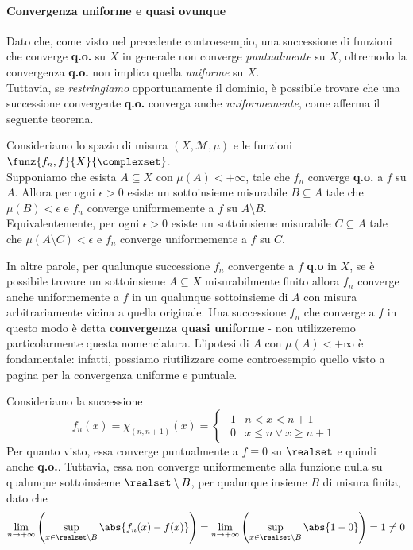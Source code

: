 \paragraph{Convergenza uniforme e quasi ovunque}
Dato che, come visto nel precedente controesempio, una successione di funzioni che converge \textbf{q.o.} su $X$ in generale non converge \textit{puntualmente} su $X$, oltremodo la convergenza \textbf{q.o.} non implica quella \textit{uniforme} su $X$.\\
Tuttavia, se \textit{restringiamo} opportunamente il dominio, è possibile trovare che una successione convergente \textbf{q.o.} converga anche \textit{uniformemente}, come afferma il seguente teorema.
\begin{theoremaqed}
	Consideriamo lo spazio di misura $\left(X,\mathcal{M},\mu\right)$ e le funzioni $\funz{f_n,f}{X}{\complexset}$.\\
	Supponiamo che esista $A\subseteq X$ con $\mu(A)<+\infty$, tale che $f_n$ converge \textbf{q.o.} a $f$ su $A$. Allora per ogni $\epsilon>0$ esiste un sottoinsieme misurabile $B\subseteq A$ tale che $\mu(B)< \epsilon$ e $f_n$ converge uniformemente a $f$ su $A\setminus B$.\\
	Equivalentemente, per ogni $\epsilon>0$ esiste un sottoinsieme misurabile $C\subseteq A$ tale che $\mu(A\setminus C)<\epsilon$  e $f_n$ converge uniformemente a $f$ su $C$.
\end{theoremaqed}
In altre parole, per qualunque successione $f_n$ convergente a $f$ \textbf{q.o} in $X$, se è possibile trovare un sottoinsieme $A\subseteq X$ misurabilmente finito allora $f_n$ converge anche uniformemente a $f$ in un qualunque sottoinsieme di $A$ con misura arbitrariamente vicina a quella originale. Una successione $f_n$ che converge a $f$ in questo modo è detta \textbf{convergenza quasi uniforme} - non utilizzeremo particolarmente questa nomenclatura.
L'ipotesi di $A$ con $\mu(A)<+\infty$ è fondamentale: infatti, possiamo riutilizzare come controesempio quello visto a pagina \pageref{controesempiouniformepuntuale} per la convergenza uniforme e puntuale.
\begin{example}
	Consideriamo la successione
	\begin{equation*}
		f_n(x)=\chi_{(n,n+1)}(x)=
		\begin{cases}
			\begin{array}{ll}
				1&n<x<n+1\\
				0&x\leq n\vee x\geq n+1
			\end{array}
		\end{cases}
	\end{equation*}
	Per quanto visto, essa converge puntualmente a $f\equiv 0$ su $\realset$ e quindi anche \textbf{q.o.}. Tuttavia, essa non converge uniformemente alla funzione nulla su qualunque sottoinsieme $\realset\setminus B$, per qualunque insieme $B$ di misura finita, dato che
	\begin{equation*}
		\lim_{n\to+\infty}\left(\sup_{x\in\realset\setminus B}\abs{f_n(x)-f(x)}\right)=\lim_{n\to+\infty}\left(\sup_{x\in\realset\setminus B}\abs{1-0}\right)=1\neq 0
	\end{equation*}
\end{example}
